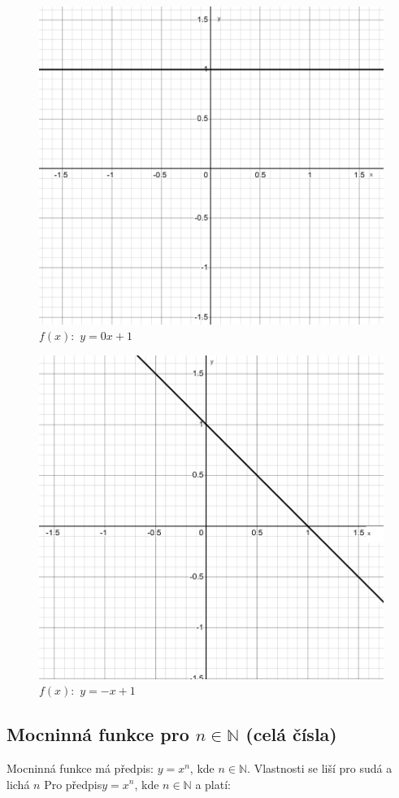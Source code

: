 \begin{figure}[H]
        \centering
        \includegraphics[width=0.4\linewidth]{img/2_graf_y=0x+1.png}
        \caption{$f(x):$ $y=0x+1$}
        \label{fig:enter-label}
    \end{figure}

\begin{figure}[H]
        \centering
        \includegraphics[width=0.4\linewidth]{img/2_graf_y=-x+1.png}
        \caption{$f(x):$ $y=-x+1$}
        \label{fig:enter-label}
    \end{figure}

\subsection{Mocninná funkce pro $n \in \mathbb{N}$ (celá čísla)}
Mocninná funkce má předpis: $y=x^n$, kde $n \in \mathbb{N}$. Vlastnosti se liší pro sudá a lichá $n$
Pro předpis$y=x^n$, kde $n \in \mathbb{N}$ a platí: \\

